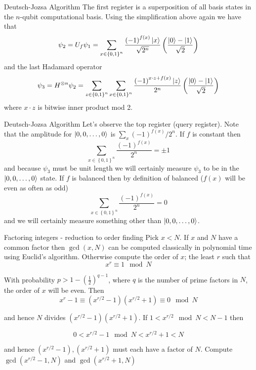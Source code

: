 \documentclass{beamer}
\begin{document}
\begin{frame}{Deutsch-Jozsa Algorithm}
The first register is a superposition of all basis states in the $n$-qubit
computational basis. Using the simplification above again we have
that 
\[
\psi_{2}=U_{f}\psi_{1}=\sum_{x\in\left\{ 0,1\right\} ^{n}}\frac{\left(-1\right)^{f\left(x\right)}\Ket{x}}{\sqrt{2^{n}}}\left(\frac{\Ket{0}-\Ket{1}}{\sqrt{2}}\right)
\]
and the last Hadamard operator 
\[
\psi_{3}=H^{\otimes n}\psi_{2}=\sum_{z\in\left\{ 0,1\right\} ^{n}}\sum_{x\in\left\{ 0,1\right\} ^{n}}\frac{\left(-1\right)^{x\cdot z+f\left(x\right)}\Ket{z}}{2^{n}}\left(\frac{\Ket{0}-\Ket{1}}{\sqrt{2}}\right)
\]
where $x\cdot z$ is bitwise inner product mod 2.  
\end{frame}

\begin{frame}{Deutsch-Jozsa Algorithm}
Let's observe the
top register (query register). Note that the amplitude for $\Ket{0,0,\dots,0}$
is $\sum_{x}\left(-1\right)^{f\left(x\right)}/2^{n}$. If $f$ is
constant then
\[
\sum_{x\in\left\{ 0,1\right\} ^{n}}\frac{\left(-1\right)^{f\left(x\right)}}{2^{n}}=\pm1
\]
and because $\psi_{3}$ must be unit length we will certainly measure
$\psi_{3}$ to be in the $\Ket{0,0,\dots,0}$ state. If $f$ is
balanced then by definition of balanced ($f\left(x\right)$ will be
even as often as odd) 
\[
\sum_{x\in\left\{ 0,1\right\} ^{n}}\frac{\left(-1\right)^{f\left(x\right)}}{2^{n}}=0
\]
and we will certainly measure something other than $\Ket{0,0,\dots,0}$.
\end{frame}


\begin{frame}{Factoring integers - reduction to order finding}
Pick $x<N$. If $x$ and $N$ have a common factor then $\gcd(x,N)$ can be computed classically in polynomial time using Euclid's algorithm. Otherwise compute the order of $x$; the least $r$ such that
\[
x^r\equiv 1 \mod N
\]

With probability $p>1-\left(\frac{1}{2}\right)^{q-1}$, where $q$ is the number of prime factors in $N$, the order of $x$ will be even. Then
\[
x^r-1\equiv \left(x^{r/2}-1\right)\left(x^{r/2}+1\right)\equiv 0 \mod N
\]

and hence $N$ divides $\left(x^{r/2}-1\right)\left(x^{r/2}+1\right)$. If $1<x^{r/2}\mod N<N-1$ then 

\[
0<x^{r/2}-1\mod N<x^{r/2}+1<N
\]

and hence $\left(x^{r/2}-1\right),\left(x^{r/2}+1\right)$ must each have a factor of $N$. Compute $\gcd(x^{r/2}-1,N)$ and $\gcd(x^{r/2}+1,N)$ 

\end{frame}
\end{document}
